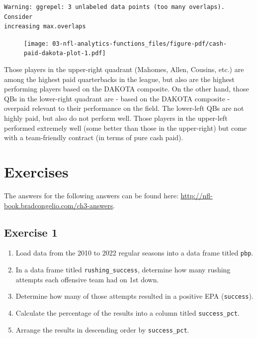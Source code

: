 \documentclass[
  letterpaper,
]{krantz}
\providecommand{\tightlist}{%
  \setlength{\itemsep}{0pt}\setlength{\parskip}{0pt}}\usepackage{longtable,booktabs,array}
\begin{document}
\begin{verbatim}
Warning: ggrepel: 3 unlabeled data points (too many overlaps). Consider
increasing max.overlaps
\end{verbatim}

\begin{figure}[H]

{\centering \texttt{[image: 03-nfl-analytics-functions\_files/figure-pdf/cash-paid-dakota-plot-1.pdf]}

}

\end{figure}

Those players in the upper-right quadrant (Mahomes, Allen, Cousins,
etc.) are among the highest paid quarterbacks in the league, but also
are the highest performing players based on the DAKOTA composite. On the
other hand, those QBs in the lower-right quadrant are - based on the
DAKOTA composite - overpaid relevant to their performance on the field.
The lower-left QBs are not highly paid, but also do not perform well.
Those players in the upper-left performed extremely well (some better
than those in the upper-right) but come with a team-friendly contract
(in terms of pure cash paid).

\hypertarget{exercises-1}{%
\section{Exercises}\label{exercises-1}}

The answers for the following answers can be found here:
\url{http://nfl-book.bradcongelio.com/ch3-answers}.

\hypertarget{exercise-1-1}{%
\subsection{\texorpdfstring{\textbf{Exercise
1}}{Exercise 1}}\label{exercise-1-1}}

\begin{enumerate}
\def\labelenumi{\arabic{enumi}.}
\tightlist
\item
  Load data from the 2010 to 2022 regular seasons into a data frame
  titled \texttt{pbp}.
\item
  In a data frame titled \texttt{rushing\_success}, determine how many
  rushing attempts each offensive team had on 1st down.
\item
  Determine how many of those attempts resulted in a positive EPA
  (\texttt{success}).
\item
  Calculate the percentage of the results into a column titled
  \texttt{success\_pct}.
\item
  Arrange the results in descending order by \texttt{success\_pct}.
\end{enumerate}
\end{document}
